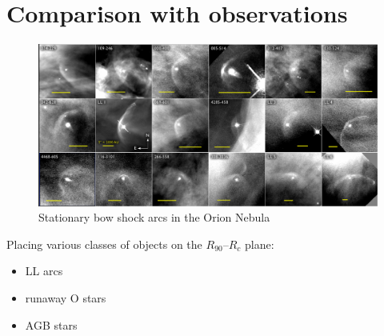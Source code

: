 
\section{Comparison with observations}
\label{sec:comp-with-observ}

\begin{figure}
  \centering
  \includegraphics[width=\textwidth]{figs/annotated-ll-arcs}
  \caption[]{Stationary bow shock arcs in the Orion Nebula}
  \label{fig:ll-arcs}
\end{figure}

Placing various classes of objects on the \(R_{90}\)--\(R_c\) plane:
\begin{itemize}
\item LL arcs
\item runaway O stars
\item AGB stars
\end{itemize}

